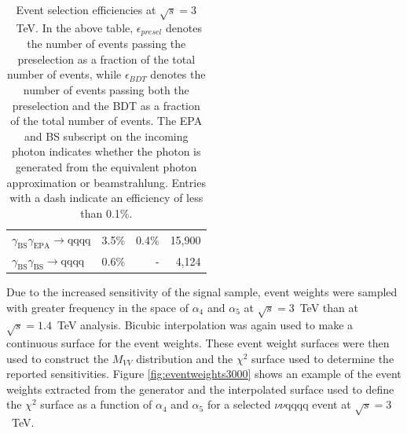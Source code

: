 \begin{table}[h!]
\begin{tabular}{ l r r r }
$\gamma_{\text{BS}}\gamma_{\text{EPA}} \rightarrow \text{qqqq}$ & 3.5\% & 0.4\% & 15,900 \\
$\gamma_{\text{BS}}\gamma_{\text{BS}} \rightarrow \text{qqqq}$ & 0.6\% & - & 4,124 \\
\hline
\end{tabular}
\caption[Event selection efficiencies at $\sqrt{s}=3$~TeV.  In the above table, $\epsilon_{presel}$ denotes the number of events passing the preselection as a fraction of the total number of events, while $\epsilon_{BDT}$ denotes the number of events passing both the preselection and the BDT as a fraction of the total number of events.  The EPA and BS subscript on the incoming photon indicates whether the photon is generated from the equivalent photon approximation or beamstrahlung.  Entries with a dash indicate an efficiency of less than 0.1\%.]{Event selection efficiencies at $\sqrt{s}=3$~TeV.  In the above table, $\epsilon_{presel}$ denotes the number of events passing the preselection as a fraction of the total number of events, while $\epsilon_{BDT}$ denotes the number of events passing both the preselection and the BDT as a fraction of the total number of events.  The EPA and BS subscript on the incoming photon indicates whether the photon is generated from the equivalent photon approximation or beamstrahlung.  Entries with a dash indicate an efficiency of less than 0.1\%.}
\label{table:selectionsummary3000GeV}
\end{table}

Due to the increased sensitivity of the signal sample, event weights were sampled with greater frequency in the space of $\alpha_{4}$ and $\alpha_{5}$ at $\sqrt{s}=3$~TeV than at $\sqrt{s}=1.4$~TeV analysis.  Bicubic interpolation was again used to make a continuous surface for the event weights.  These event weight surfaces were then used to construct the $M_{VV}$ distribution and the $\chi^{2}$ surface used to determine the reported sensitivities.  Figure \ref{fig:eventweights3000} shows an example of the event weights extracted from the generator and the interpolated surface used to define the $\chi^{2}$ surface as a function of $\alpha_{4}$ and $\alpha_{5}$ for a selected $\nu\nu\text{qqqq}$ event at $\sqrt{s}=3$~TeV.


